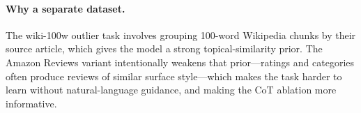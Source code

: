 \paragraph{Why a separate dataset.} The wiki-100w outlier task involves grouping 100-word Wikipedia chunks by their source article, which gives the model a strong topical-similarity prior. The Amazon Reviews variant intentionally weakens that prior---ratings and categories often produce reviews of similar surface style---which makes the task harder to learn without natural-language guidance, and making the CoT ablation more informative.
